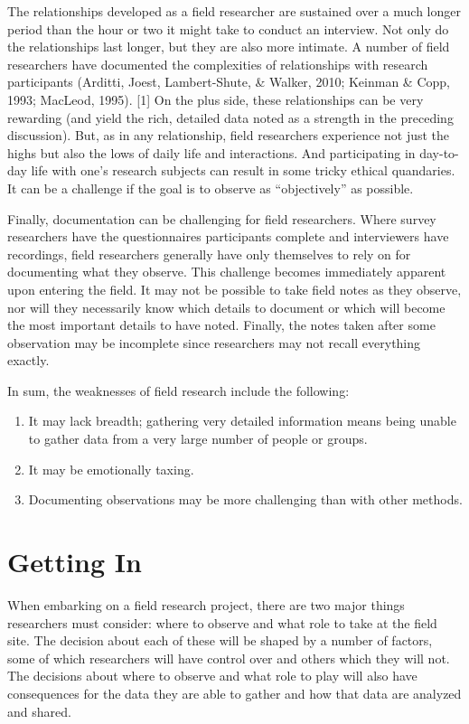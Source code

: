 The relationships developed as a field researcher are sustained over a much longer period than the hour or two it might take to conduct an interview. Not only do the relationships last longer, but they are also more intimate. A number of field researchers have documented the complexities of relationships with research participants (Arditti, Joest, Lambert-Shute, \& Walker, 2010; Keinman \& Copp, 1993; MacLeod, 1995). [1] On the plus side, these relationships can be very rewarding (and yield the rich, detailed data noted as a strength in the preceding discussion). But, as in any relationship, field researchers experience not just the highs but also the lows of daily life and interactions. And participating in day-to-day life with one’s research subjects can result in some tricky ethical quandaries. It can be a challenge if the goal is to observe as ``objectively'' as possible.

Finally, documentation can be challenging for field researchers. Where survey researchers have the questionnaires participants complete and interviewers have recordings, field researchers generally have only themselves to rely on for documenting what they observe. This challenge becomes immediately apparent upon entering the field. It may not be possible to take field notes as they observe, nor will they necessarily know which details to document or which will become the most important details to have noted. Finally, the notes taken after some observation may be incomplete since researchers may not recall everything exactly.

In sum, the weaknesses of field research include the following:

\begin{enumerate}
	\item It may lack breadth; gathering very detailed information means being unable to gather data from a very large number of people or groups.
  \item It may be emotionally taxing.
	\item Documenting observations may be more challenging than with other methods.
\end{enumerate}

\section{Getting In}

When embarking on a field research project, there are two major things researchers must consider: where to observe and what role to take at the field site. The decision about each of these will be shaped by a number of factors, some of which researchers will have control over and others which they will not. The decisions about where to observe and what role to play will also have consequences for the data they are able to gather and how that data are analyzed and shared.

